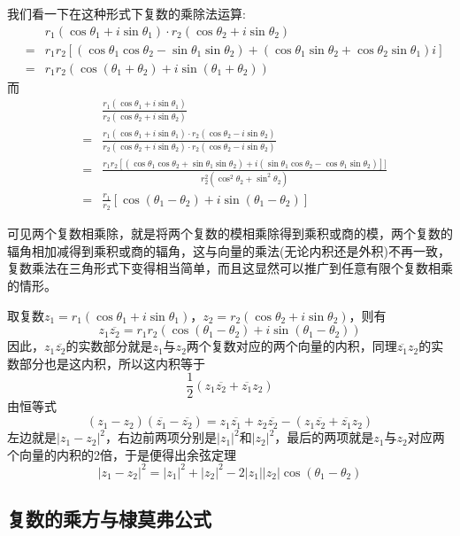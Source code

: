 我们看一下在这种形式下复数的乘除法运算:
\begin{eqnarray*}
  &&  r_1(\cos{\theta_1}+i\sin{\theta_1}) \cdot r_2(\cos{\theta_2}+i\sin{\theta_2}) \\
  & = & r_1r_2[(\cos{\theta_1}\cos{\theta_2}-\sin{\theta_1}\sin{\theta_2})+(\cos{\theta_1}\sin{\theta_2}+\cos{\theta_2}\sin{\theta_1})i] \\
  & = & r_1r_2(\cos{(\theta_1+\theta_2)}+i\sin{(\theta_1+\theta_2)})
\end{eqnarray*}
而
\begin{eqnarray*}
  &&  \frac{r_1(\cos{\theta_1}+i\sin{\theta_1})}{r_2(\cos{\theta_2}+i\sin{\theta_2})} \\
  & = & \frac{r_1(\cos{\theta_1}+i\sin{\theta_1}) \cdot r_2(\cos{\theta_2}-i\sin{\theta_2})}{r_2(\cos{\theta_2}+i\sin{\theta_2}) \cdot r_2(\cos{\theta_2}-i\sin{\theta_2})} \\
  & = & \frac{r_1r_2[(\cos{\theta_1}\cos{\theta_2}+\sin{\theta_1}\sin{\theta_2})+i(\sin{\theta_1}\cos{\theta_2}-\cos{\theta_1}\sin{\theta_2})]]}{r_2^2(\cos^2{\theta_2}+\sin^2{\theta_2})} \\
  & = & \frac{r_1}{r_2}[\cos{(\theta_1-\theta_2)+i\sin{(\theta_1-\theta_2)}}]
\end{eqnarray*}

可见两个复数相乘除，就是将两个复数的模相乘除得到乘积或商的模，两个复数的辐角相加减得到乘积或商的辐角，这与向量的乘法(无论内积还是外积)不再一致，复数乘法在三角形式下变得相当简单，而且这显然可以推广到任意有限个复数相乘的情形。

\begin{example}[利用共轭复数证明余弦定理]
  取复数$z_1=r_1(\cos{\theta_1}+i\sin{\theta_1})$，$z_2=r_2(\cos{\theta_2}+i\sin{\theta_2})$，则有
  \[ z_1\overline{z_2} = r_1r_2(\cos{(\theta_1-\theta_2)+i\sin{(\theta_1-\theta_2)}}) \]
  因此，$z_1\overline{z_2}$的实数部分就是$z_1$与$z_2$两个复数对应的两个向量的内积，同理$\overline{z_1}z_2$的实数部分也是这内积，所以这内积等于
  \[ \frac{1}{2}(z_1\overline{z_2}+\overline{z_1}z_2) \]
  由恒等式
  \[ (z_1-z_2)(\overline{z_1}-\overline{z_2})= z_1\overline{z_1} + z_2\overline{z_2} -(z_1\overline{z_2}+\overline{z_1}z_2) \]
  左边就是$|z_1-z_2|^2$，右边前两项分别是$|z_1|^2$和$|z_2|^2$，最后的两项就是$z_1$与$z_2$对应两个向量的内积的2倍，于是便得出余弦定理
  \[ |z_1-z_2|^2 = |z_1|^2+|z_2|^2-2|z_1||z_2|\cos{(\theta_1-\theta_2)} \]
\end{example}

\subsection{复数的乘方与棣莫弗公式}
\label{sec:demoivre-formual}



